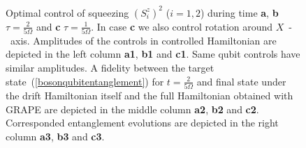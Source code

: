 \documentclass[
aps,%
12pt,%
final,%
notitlepage,%
oneside,%
onecolumn,%
nobibnotes,%
nofootinbib,%
superscriptaddress,%
noshowpacs,%
centertags]%
{revtex4}
\begin{document}
\newpage

\begin{figure}[t!]
\setcaptionmargin{5mm}
\onelinecaptionsfalse
{}
\caption{
    Optimal control of squeezing $(S^z_i)^2$ ($i=1,2$) during time {\bf a}, {\bf b} $\tau=\frac{2}{5\Omega}$ and {\bf c} $\tau=\frac{1}{5\Omega}$. In case {\bf c} we also control rotation around $X$~-~axis. Amplitudes of the controls in controlled Hamiltonian are depicted in the left column {\bf a1}, {\bf b1} and {\bf c1}. Same qubit controls have similar amplitudes. A fidelity between the target state~(\ref{bosonqubitentanglement}) for $t=\frac{2}{5\Omega}$ and final state under the drift Hamiltonian itself and the full Hamiltonian obtained with GRAPE are depicted in the middle column {\bf a2}, {\bf b2} and {\bf c2}. Corresponded entanglement evolutions are depicted in the right column {\bf a3}, {\bf b3} and {\bf c3}.
}
\label{fig4:squeezing}
\end{figure}

\newpage
\end{document}
